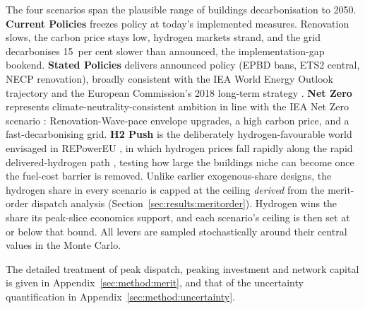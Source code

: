 The four scenarios span the plausible range of buildings decarbonisation to 2050.
\textbf{Current Policies} freezes policy at today's implemented measures.
Renovation slows, the carbon price stays low, hydrogen markets strand, and the grid
decarbonises 15~per cent slower than announced, the implementation-gap bookend.
\textbf{Stated Policies} delivers announced policy (EPBD bans, ETS2 central, NECP
renovation), broadly consistent with the IEA World Energy Outlook trajectory and
the European Commission's 2018 long-term strategy \citep{EuropeanCommission2018LTS}.
\textbf{Net Zero} represents climate-neutrality-consistent ambition in line with the
IEA Net Zero scenario \citep{IEA2023NZE}: Renovation-Wave-pace envelope upgrades, a
high carbon price, and a fast-decarbonising grid. \textbf{H2 Push} is the
deliberately hydrogen-favourable world envisaged in REPowerEU
\citep{REpowerEU2022}, in which hydrogen prices fall rapidly
along the rapid delivered-hydrogen path \citep{OIES2024hydrogenimportsET32}, testing how large the buildings niche
can become once the fuel-cost barrier is removed. Unlike earlier exogenous-share
designs, the hydrogen share in every scenario is capped at the ceiling
\emph{derived} from the merit-order dispatch analysis
(Section~\ref{sec:results:meritorder}). Hydrogen wins the share its peak-slice
economics support, and each scenario's ceiling is then set at or below that bound. All levers are sampled stochastically
around their central values in the Monte Carlo.

\noindent The detailed treatment of peak dispatch, peaking investment and network capital
is given in Appendix~\ref{sec:method:merit}, and that of the uncertainty quantification in
Appendix~\ref{sec:method:uncertainty}.

